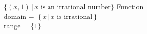 {$ \{(x, 1) \, | \, x \text{ is an irrational number}\}$}
{Function \\ domain =  $\left\{ x \, | \, \text{$x$ is irrational}\right\}$ \\ range = $\{1\}$}